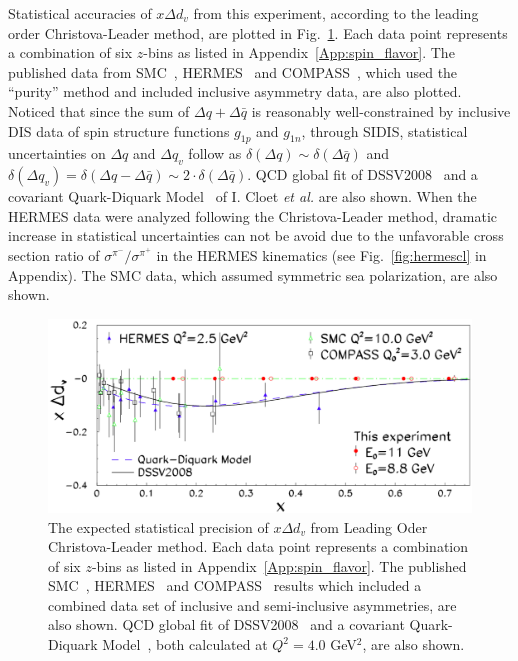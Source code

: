 Statistical accuracies of $x \Delta d_v$ from this experiment, according to the
leading order Christova-Leader method, are plotted in Fig.~\ref{fig:xqvlo1}. Each data point represents a combination of six $z$-bins as listed in Appendix~\ref{App:spin_flavor}.
The published data from SMC~\cite{Adeva:1997qz}, 
HERMES~\cite{Airapetian:2004zf} and COMPASS~\cite{Alekseev:2010ub}, which used the ``purity'' method and included inclusive asymmetry data, are also plotted. Noticed that since the sum of $\Delta q+ \Delta \bar{q}$ is reasonably well-constrained by inclusive DIS data of spin structure functions $g_{1p}$ and $g_{1n}$, through SIDIS, statistical uncertainties on $\Delta q$ and $\Delta q_v$ follow as $\delta(\Delta q) \sim \delta(\Delta \bar{q})$ and   $\delta(\Delta q_v)=\delta(\Delta q-\Delta \bar{q}) \sim 2 \cdot \delta(\Delta \bar{q})$. 
QCD global fit of DSSV2008~\cite{DSSV2008} and a covariant Quark-Diquark Model~\cite{Cloet:2005pp} of I. Cloet {\it et al.} are also shown.
When the HERMES data were analyzed following the Christova-Leader method, dramatic increase
in statistical uncertainties can not be avoid due to the unfavorable cross section
ratio of $\sigma^{\pi^-}/ \sigma^{\pi^+}$ in the HERMES kinematics (see Fig.~\ref{fig:hermescl}
 in Appendix).  
 The SMC data, which assumed symmetric sea polarization, are also shown.  
\begin{figure}[htbp]
\centering
    \includegraphics[width=0.98\linewidth]{figs_xj/xdeltadv_1pannel_052814.pdf}
\caption{\label{fig:xqvlo1} The expected statistical precision of $x \Delta d_v$ from Leading Oder Christova-Leader method.  Each data point represents a combination of six $z$-bins as listed in Appendix~\ref{App:spin_flavor}.
The published SMC~\cite{Adeva:1997qz}, HERMES~\cite{Airapetian:2004zf} and COMPASS~\cite{Alekseev:2010ub}  
 results which 
included a combined data set of inclusive and semi-inclusive asymmetries, are also shown. QCD global fit of DSSV2008~\cite{DSSV2008} and a covariant Quark-Diquark Model~\cite{Cloet:2005pp}, both calculated at $Q^2=4.0$ GeV$^2$,  are also shown.
}
\end{figure}



